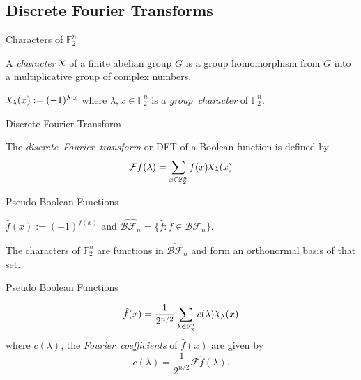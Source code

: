 \documentclass{beamer}
\def\gftwo{\mathbb{F}_2}
\def\BF{\mathcal{BF}}
\def\Chi{\raisebox{2pt}{$\chi$}}
\begin{document}
\subsection{Discrete Fourier Transforms}
\begin{frame}{Characters of $\gftwo^n$}
  \begin{definition}
    A {\em character} $\Chi$ of a finite abelian group $G$ is a group
    homomorphism from $G$ into a multiplicative group of complex numbers.
  \end{definition}
  \begin{fact}
    $\Chi_\lambda(x):=(-1)^{\lambda\cdot x}$ where $\lambda,x\in\gftwo^n$ is a
    {\em group\ character} of $\gftwo^n$.
  \end{fact}
\end{frame}

\begin{frame}{Discrete Fourier Transform}
  \begin{definition}\label{def:DFT}
    The {\em discrete\ Fourier\ transform} or DFT of a Boolean function is
    defined by
    \begin{equation}\label{eqn:DFT}
      \mathcal{F}f(\lambda)
        =\sum_{x\in\gftwo^n}f(x)\Chi_\lambda(x)
  	\end{equation}
  \end{definition}
\end{frame}

\begin{frame}{Pseudo Boolean Functions}
  \begin{definition}
    $\hat{f}(x):=(-1)^{f(x)}$ and $\hat{\BF_n}=\{\hat{f}:f\in\BF_n\}$.
  \end{definition}
  \begin{lemma}
    The characters of $\gftwo^n$ are functions in $\hat{\BF}_n$ and form an
    orthonormal basis of that set.
  \end{lemma}
\end{frame}

\begin{frame}{Pseudo Boolean Functions}
  \begin{lemma}
  \begin{equation}\label{eqn:rewrite-pseudo}
  	\hat{f}(x)
      =\frac{1}{2^{n/2}}
        \sum_{\lambda\in\gftwo^n}c(\lambda)\Chi_\lambda(x)
  \end{equation}
  	where $c(\lambda)$, the {\em Fourier\ coefficients} of $\hat{f}(x)$ are
    given by
    \begin{equation}\label{eqn:clambda}
      c(\lambda)=\frac{1}{2^{n/2}}\mathcal{F}\hat{f}(\lambda).
    \end{equation}
  \end{lemma}
\end{frame}
\end{document}
